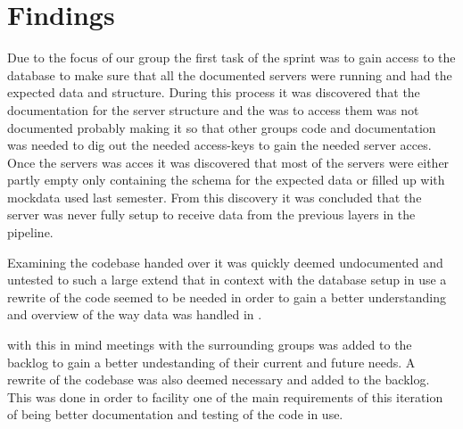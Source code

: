 \section{Findings}
Due to the focus of our group the first task of the sprint was to gain access to the database to make 
sure that all the documented servers were running and had the expected data and structure. During this 
process it was discovered that the documentation for the server structure and the was to access them was 
not documented probably making it so that other groups code and documentation was needed to dig out the 
needed access-keys to gain the needed server acces. Once the servers was acces it was discovered that most 
of the servers were either partly empty only containing the schema for the expected data or filled up with 
mockdata used last semester. From this discovery it was concluded that the server was never fully setup 
to receive data from the previous layers in the pipeline. 


Examining the codebase handed over it was quickly deemed undocumented and untested to such a large extend 
that in context with the database setup in use a rewrite of the code seemed to be needed in order to gain 
a better understanding and overview of the way data was handled in \knox. 


with this in mind meetings with the surrounding groups was added to the backlog to gain a better 
undestanding of their current and future needs. A rewrite of the codebase was also deemed necessary and 
added to the backlog. This was done in order to facility one of the main requirements of this iteration 
of \knox being better documentation and testing of the code in use. 






